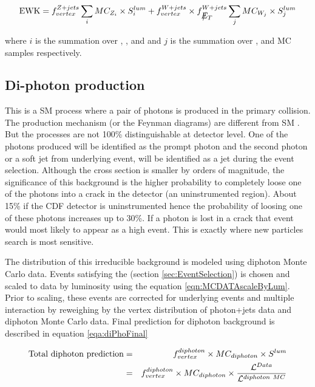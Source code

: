 \documentclass[11pt]{article}
\begin{document}
\begin{equation}
\mathrm{EWK} = f_{vertex}^{Z+jets} \displaystyle\sum_{i} {MC_{Z_{i}}\times S^{lum}_{i}} +
f_{vertex}^{W+jets}\times f_{\met}^{W+jets} \displaystyle\sum_{j} {MC_{W_{j}}\times S^{lum}_{j}}
\label{eqa:EWKtotalWeightedLumScaled}
\end{equation}

where $i$ is the summation over \zee, \zmm, and \ztt and $j$ is the summation over \wen, \wmn and \wtn MC samples respectively.

\subsection{Di-photon production}\label{sec:diphoton}
This is a SM process where a pair of photons is produced in the primary collision. The production mechanism (or the Feynman diagrams) are different from SM \phojets. But the processes are not 100\% distinguishable at detector level. One of the photons produced will be identified as the prompt photon and the second photon or a soft jet from underlying event, will be identified as a jet during the event selection. Although the cross section is smaller by orders of magnitude, the significance of this background is the higher probability to completely loose one of the photons into a crack in the detector (an uninstrumented region). About 15\% if the CDF detector is uninstrumented hence the probability of loosing one of these photons increases up to 30\%. If a photon is lost in a crack that event would most likely to appear as a high \met event. This is exactly where new particles search is most sensitive.

The distribution of this irreducible background is modeled using diphoton Monte Carlo data. Events satisfying the  (section \ref{sec:EventSelection}) is chosen and scaled to data by luminosity using the equation \ref{eqn:MCDATAscaleByLum}. Prior to scaling, these events are corrected for underlying events and multiple interaction by reweighing by the vertex distribution of photon+jets data and diphoton Monte Carlo data. Final prediction for diphoton background is described in equation \ref{eqa:diPhoFinal}

\begin{eqnarray}
\mathrm{Total~diphoton~prediction} &=& f_{vertex}^{diphoton}\times MC_{diphoton} \times S^{lum}
 \nonumber\\
&=& f_{vertex}^{diphoton}\times MC_{diphoton} \times \frac{{\cal L}^{Data}}{{\cal L}^{diphoton~MC}}
\label{eqa:diPhoFinal}
\end{eqnarray}
\end{document}
